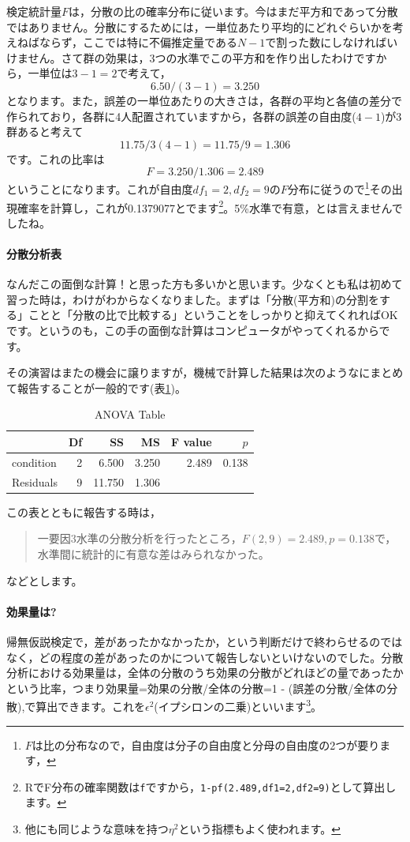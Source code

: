 \documentclass{ltjsarticle}
\begin{document}
検定統計量$F$は，分散の比の確率分布に従います。今はまだ平方和であって分散ではありません。分散にするためには，一単位あたり平均的にどれぐらいかを考えねばならず，ここでは特に不偏推定量である$N-1$で割った数にしなければいけません。さて群の効果は，3つの水準でこの平方和を作り出したわけですから，一単位は$3-1=2$で考えて，
\[ 6.50 / (3-1) = 3.250\]
となります。また，誤差の一単位あたりの大きさは，各群の平均と各値の差分で作られており，各群に4人配置されていますから，各群の誤差の自由度($4-1$)が3群あると考えて
\[ 11.75/3(4-1)=11.75/9 = 1.306\]
です。これの比率は
\[F = 3.250/1.306 = 2.489\]
ということになります。これが自由度$df_1 =2,df_2 = 9$の$F$分布に従うので\footnote{$F$は比の分布なので，自由度は分子の自由度と分母の自由度の2つが要ります，}その出現確率を計算し，これが0.1379077とでます\footnote{RでF分布の確率関数は\texttt{f}ですから，\texttt{1-pf(2.489,df1=2,df2=9)}として算出します。}。5\%水準で有意，とは言えませんでしたね。
\paragraph{分散分析表}
なんだこの面倒な計算！と思った方も多いかと思います。少なくとも私は初めて習った時は，わけがわからなくなりました。まずは「分散(平方和)の分割をする」ことと「分散の比で比較する」ということをしっかりと抑えてくれればOKです。というのも，この手の面倒な計算はコンピュータがやってくれるからです。

その演習はまたの機会に譲りますが，機械で計算した結果は次のようなにまとめて報告することが一般的です(表\ref{tbl::21_05})。
\begin{table}[ht]
    \centering
    \caption{ANOVA Table} 
    \begin{tabular}{lrrrrr}
      \hline
     & Df & SS & MS & F value & $p$ \\ 
      \hline
    condition   & 2 & 6.500 & 3.250 & 2.489 & 0.138 \\ 
      Residuals   & 9 & 11.750 & 1.306 &  &  \\ 
       \hline
    \end{tabular}
    \label{tbl::21_05}
    \end{table}
この表とともに報告する時は，
\begin{quote}
    一要因3水準の分散分析を行ったところ，$F(2,9)=2.489,p=0.138$で，水準間に統計的に有意な差はみられなかった。
\end{quote}
などとします。

\paragraph{効果量は?}
帰無仮説検定で，差があったかなかったか，という判断だけで終わらせるのではなく，どの程度の差があったのかについて報告しないといけないのでした。分散分析における効果量は，全体の分散のうち効果の分散がどれほどの量であったかという比率，つまり効果量=効果の分散/全体の分散=1 - (誤差の分散/全体の分散),で算出できます。これを$\epsilon^2$(イプシロンの二乗)といいます\footnote{他にも同じような意味を持つ$\eta^2$という指標もよく使われます。}。
\end{document}

